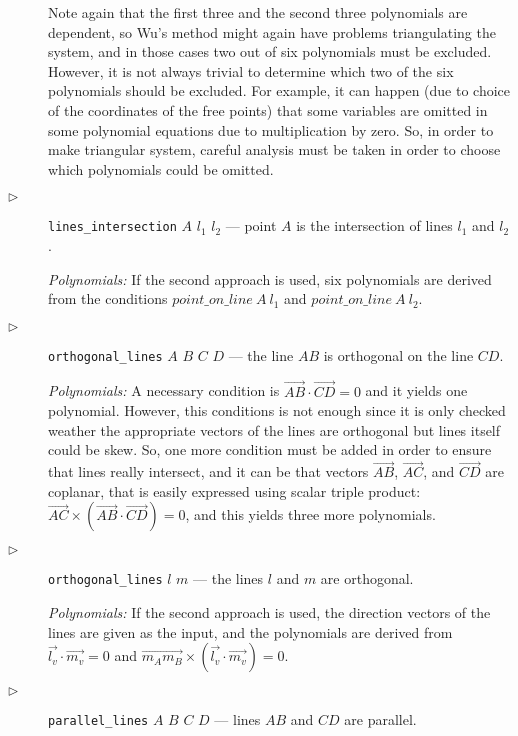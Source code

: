 \documentclass[final,1p,times,authoryear]{elsarticle}
\begin{document}
\begin{description}
Note again that the first three and the second three polynomials are
dependent, so Wu's method might again have problems triangulating the
system, and in those cases two out of six polynomials must be
excluded. However, it is not always trivial to determine which two of
the six polynomials should be excluded. For example, it can happen
(due to choice of the coordinates of the free points) that some
variables are omitted in some polynomial equations due to
multiplication by zero. So, in order to make triangular system,
careful analysis must be taken in order to choose which polynomials
could be omitted.

\item[$\triangleright$] {\tt lines\_intersection} $A$ $l_1$ $l_2$
  --- point $A$ is the intersection of lines $l_1$ and $l_2$.

  {\em Polynomials:} If the second approach is used, six polynomials
  are derived from the conditions $point\_on\_line\ A\ l_1$ and
  $point\_on\_line\ A\ l_2$.

\item[$\triangleright$] {\tt orthogonal\_lines} $A$ $B$ $C$ $D$ ---
  the line $AB$ is orthogonal on the line $CD$.

  {\em Polynomials:} A necessary condition is
  $\overrightarrow{AB} \cdot \overrightarrow{CD} = 0$ and it yields
  one polynomial. However, this conditions is not enough since it is
  only checked weather the appropriate vectors of the lines are
  orthogonal but lines itself could be skew. So, one more condition
  must be added in order to ensure that lines really intersect, and it
  can be that vectors $\overrightarrow{AB}$, $\overrightarrow{AC}$,
  and $\overrightarrow{CD}$ are coplanar, that is easily expressed
  using scalar triple product:
  $\overrightarrow{AC} \times (\overrightarrow{AB} \cdot
  \overrightarrow{CD}) = 0$, and this yields three more polynomials.

\item[$\triangleright$] {\tt orthogonal\_lines} $l$ $m$ --- the lines
  $l$ and $m$ are orthogonal.

  {\em Polynomials:} If the second approach is used, the direction
  vectors of the lines are given as the input, and the polynomials are
  derived from $\overrightarrow{l_v} \cdot \overrightarrow{m_v} = 0$
  and
  $\overrightarrow{m_Am_B} \times (\overrightarrow{l_v} \cdot
  \overrightarrow{m_v}) = 0$.

\item[$\triangleright$] {\tt parallel\_lines} $A$ $B$ $C$ $D$ ---
  lines $AB$ and $CD$ are parallel.


\end{description}
\end{document}

